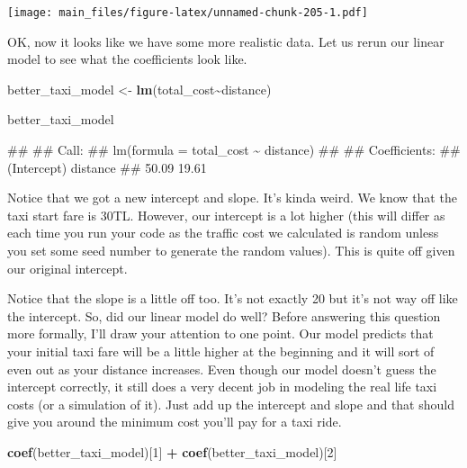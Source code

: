 \documentclass[
]{book}
\newenvironment{Shaded}{\begin{snugshade}}{\end{snugshade}}
\newcommand{\DecValTok}[1]{\textcolor[rgb]{0.00,0.00,0.81}{#1}}
\newcommand{\FunctionTok}[1]{\textcolor[rgb]{0.13,0.29,0.53}{\textbf{#1}}}
\newcommand{\NormalTok}[1]{#1}
\newcommand{\OtherTok}[1]{\textcolor[rgb]{0.56,0.35,0.01}{#1}}
\newcommand{\SpecialCharTok}[1]{\textcolor[rgb]{0.81,0.36,0.00}{\textbf{#1}}}
\begin{document}
\texttt{[image: main\_files/figure-latex/unnamed-chunk-205-1.pdf]}

OK, now it looks like we have some more realistic data. Let us rerun our linear model to see what the coefficients look like.

\begin{Shaded}
\begin{Highlighting}[]
\NormalTok{better\_taxi\_model }\OtherTok{\textless{}{-}} \FunctionTok{lm}\NormalTok{(total\_cost}\SpecialCharTok{\textasciitilde{}}\NormalTok{distance)}

\NormalTok{better\_taxi\_model}
\end{Highlighting}
\end{Shaded}

\begin{Shaded}
\begin{Highlighting}[]
\NormalTok{\#\# }
\NormalTok{\#\# Call:}
\NormalTok{\#\# lm(formula = total\_cost \textasciitilde{} distance)}
\NormalTok{\#\# }
\NormalTok{\#\# Coefficients:}
\NormalTok{\#\# (Intercept)     distance  }
\NormalTok{\#\#       50.09        19.61}
\end{Highlighting}
\end{Shaded}

Notice that we got a new intercept and slope. It's kinda weird. We know that the taxi start fare is 30TL. However, our intercept is a lot higher (this will differ as each time you run your code as the traffic cost we calculated is random unless you set some seed number to generate the random values). This is quite off given our original intercept.

Notice that the slope is a little off too. It's not exactly 20 but it's not way off like the intercept. So, did our linear model do well? Before answering this question more formally, I'll draw your attention to one point. Our model predicts that your initial taxi fare will be a little higher at the beginning and it will sort of even out as your distance increases. Even though our model doesn't guess the intercept correctly, it still does a very decent job in modeling the real life taxi costs (or a simulation of it). Just add up the intercept and slope and that should give you around the minimum cost you'll pay for a taxi ride.

\begin{Shaded}
\begin{Highlighting}[]
\FunctionTok{coef}\NormalTok{(better\_taxi\_model)[}\DecValTok{1}\NormalTok{] }\SpecialCharTok{+} \FunctionTok{coef}\NormalTok{(better\_taxi\_model)[}\DecValTok{2}\NormalTok{]}
\end{Highlighting}
\end{Shaded}
\end{document}
